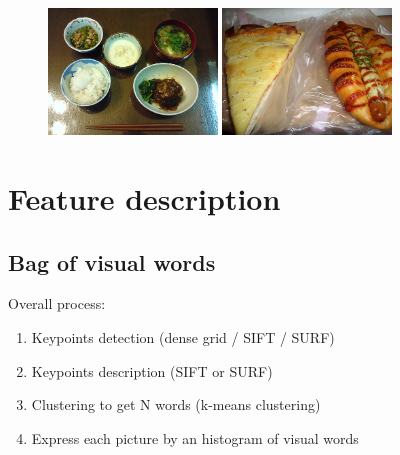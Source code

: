 \documentclass[aspectratio=169]{beamer}
\let\oldsection\section
\renewcommand{\section}[1]{
    \oldsection{#1}	
    \subsection{}
}
\newenvironment{myframe}[1][t]{\begin{frame}[#1]{\secname}{\subsecname}}{\end{frame}}
\begin{document}
    \begin{myframe}
        \begin{figure}[h]
            \includegraphics[width=0.4\textwidth,  height=0.4\textwidth ]{../img/multiple_food_items_1}
            \includegraphics[width=0.4\textwidth,  height=0.4\textwidth ]{../img/multiple_food_items_4}
        \end{figure}
    \end{myframe}
    
    \section{Feature description}
    
    \subsection{Bag of visual words}
    
    \begin{myframe}
        Overall process:
        \begin{enumerate}
            \item Keypoints detection (dense grid / SIFT  / SURF)
            \item Keypoints description (SIFT or SURF)
            \item Clustering to get N words (k-means clustering)
            \item Express each picture by an histogram of visual words
        \end{enumerate}
    \end{myframe}
    
\end{document}
